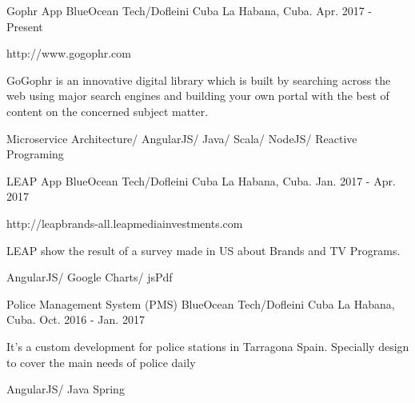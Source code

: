 


\begin{cventries}


\cventry
{Gophr App} %
{BlueOcean Tech/Dofleini Cuba} %
{La Habana, Cuba.} %
{Apr. 2017 - Present} %
{ %
\begin{cvitems}
\item {http://www.gogophr.com}
\item {GoGophr is an innovative digital library which is built by searching across the web using major search engines and building your own portal with the best of content on the concerned subject matter.}
\item {Microservice Architecture/ AngularJS/ Java/ Scala/ NodeJS/ Reactive Programing}
\end{cvitems}
}


\cventry
{LEAP App} %
{BlueOcean Tech/Dofleini Cuba} %
{La Habana, Cuba.} %
{Jan. 2017 - Apr. 2017} %
{ %
\begin{cvitems}
\item {http://leapbrands-all.leapmediainvestments.com}
\item {LEAP show the result of a survey made in US about Brands and TV Programs.}
\item {AngularJS/ Google Charts/ jsPdf}
\end{cvitems}
}


\cventry
{Police Management System (PMS)} %
{BlueOcean Tech/Dofleini Cuba} %
{La Habana, Cuba.} %
{Oct. 2016 - Jan. 2017} %
{ %
\begin{cvitems}
\item {It’s a custom development for police stations in Tarragona Spain. Specially design to cover the main needs of police daily}
\item {AngularJS/ Java Spring}
\end{cvitems}
}


\end{cventries}
